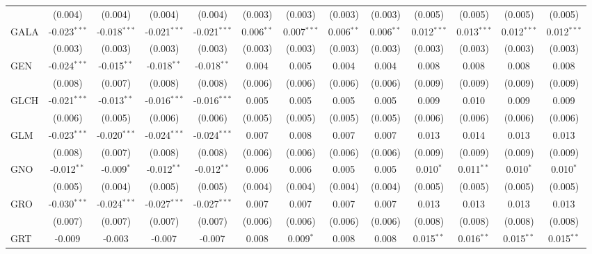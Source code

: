 \begin{table}[!htbp]
\begin{tabular}{@{\extracolsep{5pt}}lcccccccccccc}
  & (0.004) & (0.004) & (0.004) & (0.004) & (0.003) & (0.003) & (0.003) & (0.003) & (0.005) & (0.005) & (0.005) & (0.005) \\
 GALA & -0.023$^{***}$ & -0.018$^{***}$ & -0.021$^{***}$ & -0.021$^{***}$ & 0.006$^{**}$ & 0.007$^{***}$ & 0.006$^{**}$ & 0.006$^{**}$ & 0.012$^{***}$ & 0.013$^{***}$ & 0.012$^{***}$ & 0.012$^{***}$ \\
  & (0.003) & (0.003) & (0.003) & (0.003) & (0.003) & (0.003) & (0.003) & (0.003) & (0.003) & (0.003) & (0.003) & (0.003) \\
 GEN & -0.024$^{***}$ & -0.015$^{**}$ & -0.018$^{**}$ & -0.018$^{**}$ & 0.004$^{}$ & 0.005$^{}$ & 0.004$^{}$ & 0.004$^{}$ & 0.008$^{}$ & 0.008$^{}$ & 0.008$^{}$ & 0.008$^{}$ \\
  & (0.008) & (0.007) & (0.008) & (0.008) & (0.006) & (0.006) & (0.006) & (0.006) & (0.009) & (0.009) & (0.009) & (0.009) \\
 GLCH & -0.021$^{***}$ & -0.013$^{**}$ & -0.016$^{***}$ & -0.016$^{***}$ & 0.005$^{}$ & 0.005$^{}$ & 0.005$^{}$ & 0.005$^{}$ & 0.009$^{}$ & 0.010$^{}$ & 0.009$^{}$ & 0.009$^{}$ \\
  & (0.006) & (0.005) & (0.006) & (0.006) & (0.005) & (0.005) & (0.005) & (0.005) & (0.006) & (0.006) & (0.006) & (0.006) \\
 GLM & -0.023$^{***}$ & -0.020$^{***}$ & -0.024$^{***}$ & -0.024$^{***}$ & 0.007$^{}$ & 0.008$^{}$ & 0.007$^{}$ & 0.007$^{}$ & 0.013$^{}$ & 0.014$^{}$ & 0.013$^{}$ & 0.013$^{}$ \\
  & (0.008) & (0.007) & (0.008) & (0.008) & (0.006) & (0.006) & (0.006) & (0.006) & (0.009) & (0.009) & (0.009) & (0.009) \\
 GNO & -0.012$^{**}$ & -0.009$^{*}$ & -0.012$^{**}$ & -0.012$^{**}$ & 0.006$^{}$ & 0.006$^{}$ & 0.005$^{}$ & 0.005$^{}$ & 0.010$^{*}$ & 0.011$^{**}$ & 0.010$^{*}$ & 0.010$^{*}$ \\
  & (0.005) & (0.004) & (0.005) & (0.005) & (0.004) & (0.004) & (0.004) & (0.004) & (0.005) & (0.005) & (0.005) & (0.005) \\
 GRO & -0.030$^{***}$ & -0.024$^{***}$ & -0.027$^{***}$ & -0.027$^{***}$ & 0.007$^{}$ & 0.007$^{}$ & 0.007$^{}$ & 0.007$^{}$ & 0.013$^{}$ & 0.013$^{}$ & 0.013$^{}$ & 0.013$^{}$ \\
  & (0.007) & (0.007) & (0.007) & (0.007) & (0.006) & (0.006) & (0.006) & (0.006) & (0.008) & (0.008) & (0.008) & (0.008) \\
 GRT & -0.009$^{}$ & -0.003$^{}$ & -0.007$^{}$ & -0.007$^{}$ & 0.008$^{}$ & 0.009$^{*}$ & 0.008$^{}$ & 0.008$^{}$ & 0.015$^{**}$ & 0.016$^{**}$ & 0.015$^{**}$ & 0.015$^{**}$ \\

\end{tabular}
\end{table}
